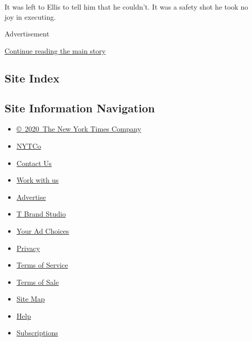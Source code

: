 It was left to Ellis to tell him that he couldn't. It was a safety shot
he took no joy in executing.

Advertisement

\protect\hyperlink{after-bottom}{Continue reading the main story}

\hypertarget{site-index}{%
\subsection{Site Index}\label{site-index}}

\hypertarget{site-information-navigation}{%
\subsection{Site Information
Navigation}\label{site-information-navigation}}

\begin{itemize}
\tightlist
\item
  \href{https://help.nytimes.com/hc/en-us/articles/115014792127-Copyright-notice}{©~2020~The
  New York Times Company}
\end{itemize}

\begin{itemize}
\tightlist
\item
  \href{https://www.nytco.com/}{NYTCo}
\item
  \href{https://help.nytimes.com/hc/en-us/articles/115015385887-Contact-Us}{Contact
  Us}
\item
  \href{https://www.nytco.com/careers/}{Work with us}
\item
  \href{https://nytmediakit.com/}{Advertise}
\item
  \href{http://www.tbrandstudio.com/}{T Brand Studio}
\item
  \href{https://www.nytimes.com/privacy/cookie-policy\#how-do-i-manage-trackers}{Your
  Ad Choices}
\item
  \href{https://www.nytimes.com/privacy}{Privacy}
\item
  \href{https://help.nytimes.com/hc/en-us/articles/115014893428-Terms-of-service}{Terms
  of Service}
\item
  \href{https://help.nytimes.com/hc/en-us/articles/115014893968-Terms-of-sale}{Terms
  of Sale}
\item
  \href{https://spiderbites.nytimes.com}{Site Map}
\item
  \href{https://help.nytimes.com/hc/en-us}{Help}
\item
  \href{https://www.nytimes.com/subscription?campaignId=37WXW}{Subscriptions}
\end{itemize}
